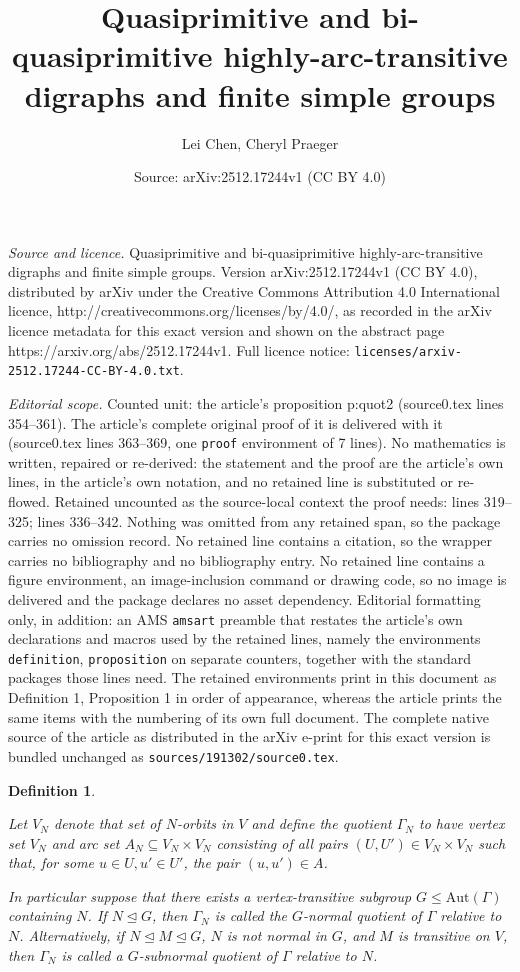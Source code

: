 \documentclass[10pt,a4paper]{amsart}
\title{Quasiprimitive and bi-quasiprimitive highly-arc-transitive digraphs and finite simple groups}
\author{Lei Chen, Cheryl Praeger}
\date{Source: arXiv:2512.17244v1 (CC BY 4.0)}
\newtheorem{definition}{Definition}
\newcommand{\Aut}{\mathrm{Aut}}
\begin{document}
\maketitle

\noindent\emph{Source and licence.} Quasiprimitive and bi-quasiprimitive highly-arc-transitive digraphs and finite simple groups. Version arXiv:2512.17244v1 (CC BY 4.0), distributed by arXiv under the Creative Commons Attribution 4.0 International licence, http://creativecommons.org/licenses/by/4.0/, as recorded in the arXiv licence metadata for this exact version and shown on the abstract page https://arxiv.org/abs/2512.17244v1. Full licence notice: \texttt{licenses/arxiv-2512.17244-CC-BY-4.0.txt}.\par\smallskip

\noindent\textit{Editorial scope.} Counted unit: the article's proposition p:quot2 (source0.tex lines 354--361). The article's complete original proof of it is delivered with it (source0.tex lines 363--369, one \texttt{proof} environment of 7 lines). No mathematics is written, repaired or re-derived: the statement and the proof are the article's own lines, in the article's own notation, and no retained line is substituted or re-flowed.  Retained uncounted as the source-local context the proof needs: lines 319--325; lines 336--342.  Nothing was omitted from any retained span, so the package carries no omission record.  No retained line contains a citation, so the wrapper carries no bibliography and no bibliography entry.  No retained line contains a figure environment, an image-inclusion command or drawing code, so no image is delivered and the package declares no asset dependency.  Editorial formatting only, in addition: an AMS \texttt{amsart} preamble that restates the article's own declarations and macros used by the retained lines, namely the environments \texttt{definition}, \texttt{proposition} on separate counters, together with the standard packages those lines need.  The retained environments print in this document as Definition 1, Proposition 1 in order of appearance, whereas the article prints the same items with the numbering of its own full document.  The complete native source of the article as distributed in the arXiv e-print for this exact version is bundled unchanged as \texttt{sources/191302/source0.tex}.
\begin{definition}\label{d:nquot}
{\rm 
    Let $V_N$ denote that set of $N$-orbits in $V$ and define the \emph{quotient} \(\Gamma_N\) to have vertex set $V_N$ and arc set $A_N\subseteq V_N\times V_N$ consisting of all pairs $(U,U')\in V_N\times V_N$ such that,  for some $u\in U, u'\in U'$, the pair $(u,u')\in A$.  

    In particular suppose that there exists a vertex-transitive subgroup $G\leq \Aut(\Gamma)$ containing $N$. If $N\unlhd G$, then $\Gamma_N$ is called the \emph{$G$-normal quotient of $\Gamma$ relative to $N$}. Alternatively, if $N \unlhd M\unlhd G$, $N$ is not normal in $G$, and $M$ is transitive on $V$, then $\Gamma_N$ is called a \emph{$G$-subnormal quotient of $\Gamma$ relative to $N$}.
    }
\end{definition}
\end{document}
